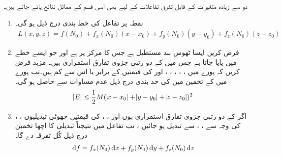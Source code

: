 دو سے زیادہ متغیرات کے  قابل تفرق تفاعلات کے لیے بھی اسی قسم کے مماثل نتائج پائے جاتے ہیں۔
\begin{enumerate}[1.]
\item
نقطہ  پر تفاعل  کی خط بندی  درج ذیل ہو گی۔
{\small{
\begin{align}\label{مساوات_کثیرالمتغیر_تین_متغیر_تفاعل_تخمین}
L(x,y,z)=f(N_0)+f_x(N_0)(x-x_0)+f_y(N_0)(y-y_0)+f_z(N_0)(z-z_0)
\end{align}
}}
\item
فرض کریں     ایسا  ٹھوس بند  مستطیل  ہے جس کا مرکز  پر  ہے اور جو  ایسے خطے  میں پایا جاتا ہے  جس میں  کے دو رتبی جزوی تفارق استمراری ہیں۔ مزید فرض کریں کہ پورے  میں  ،  ،  ،  ،  ،  اور   کی قیمتیں  کے برابر یا اس سے کم ہیں۔تب پورے  میں    کے  تخمین  میں  کی  حد بندی   درج ذیل عدم مساوات سے حاصل ہو گی۔
\begin{align}\label{مساوات_کثیرالمتغیر_تین_متغیر_تفاعل_خلل}
\abs{E}\le \frac{1}{2}M(\abs{x-x_0}+\abs{y-y_0}+\abs{z-z_0})^2
\end{align} 
\item
اگر  کے  دو رتبی جزوی تفارق استمراری ہوں اور ، ،   کی قیمتیں  چھوٹی تبدیلیوں ، ،  کی وجہ سے  ، ،  سے تبدیل ہو جائیں ، تب تفاعل  میں نتیجتاً تبدیلی کا اچھا تخمین  درج ذیل  کُل  تفرقہ دے گا۔
\begin{align*}
\dif f =f_x(N_0)\dif x+f_y(N_0)\dif y+f_z(N_0)\dif z
\end{align*}
\end{enumerate}

